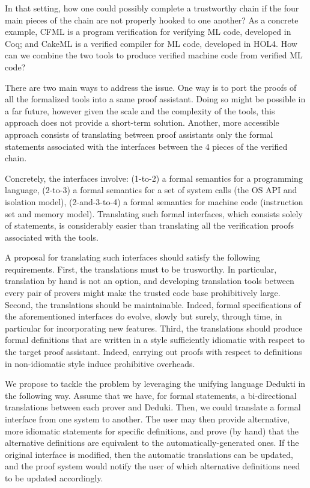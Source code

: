 \begin{workpackage}[id=libraries,wphases=0-48,type=RTD,
  short=Libraries,%
  title=Libraries,
  lead=Inr,
  InrRM=10,
  TumRM=36]
In that setting, how one could possibly complete a trustworthy chain if
the four main pieces of the chain are not properly hooked to one another?
As a concrete example, CFML is a program verification for verifying ML code,
developed in Coq; and CakeML is a verified compiler for ML code,
developed in HOL4. How can we combine the two tools to produce verified
machine code from verified ML code?

There are two main ways to address the issue. One way is to port the
proofs of all the formalized tools into a same proof assistant.
Doing so might be possible in a far future, however given the scale and
the complexity of the tools, this approach does not provide a short-term
solution. Another, more accessible approach consists of translating
between proof assistants only the formal statements associated with the
interfaces between the 4 pieces of the verified chain.

Concretely, the interfaces involve: (1-to-2) a formal semantics for
a programming language, (2-to-3) a formal semantics for a set of
system calls (the OS API and isolation model), (2-and-3-to-4) a formal
semantics for machine code (instruction set and memory model).
Translating such formal interfaces, which consists solely of statements,
is considerably easier than translating all the verification proofs
associated with the tools.

A proposal for translating such interfaces should satisfy the following
requirements. First, the translations must to be trusworthy. In particular,
translation by hand is not an option, and developing translation tools
between every pair of provers might make the trusted code base prohibitively
large. Second, the translations should be maintainable. Indeed,
formal specifications of the aforementioned interfaces do evolve, slowly but
surely, through time, in particular for incorporating new features.
Third, the translations should produce formal definitions that are written
in a style sufficiently idiomatic with respect to the target proof assistant.
Indeed, carrying out proofs with respect to definitions in non-idiomatic
style induce prohibitive overheads.

We propose to tackle the problem by leveraging the unifying language
Dedukti in the following way. Assume that we have, for formal statements,
a bi-directional translations between each prover and Deduki. Then,
we could translate a formal interface from one system to another.
The user may then provide alternative, more idiomatic statements for
specific definitions, and prove (by hand) that the alternative definitions
are equivalent to the automatically-generated ones. If the original
interface is modified, then the automatic translations can be updated,
and the proof system would notify the user of which alternative definitions
need to be updated accordingly.


\end{workpackage}
